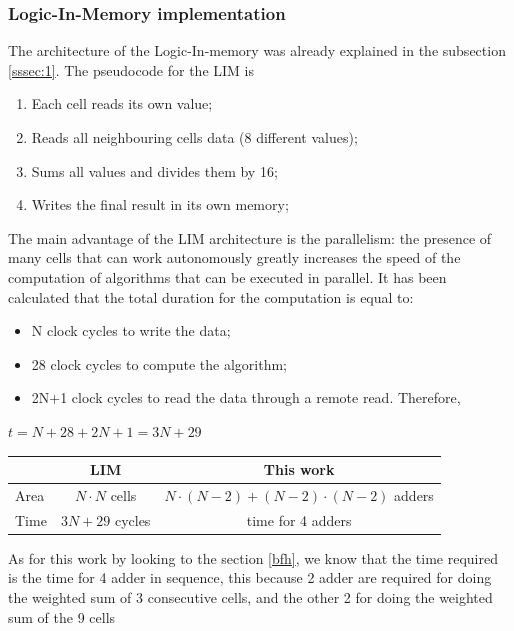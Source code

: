 	  \subsubsection{Logic-In-Memory implementation}
	  The architecture of the Logic-In-memory was already explained in the subsection \ref{sssec:1}.
	  The pseudocode for the LIM is
	  \begin{enumerate}
	  	\item Each cell reads its own value;
	  	\item Reads all neighbouring cells data (8 different values); 
	  	\item Sums all values and divides them by 16;
	  	\item Writes the final result in its own memory;
	  \end{enumerate}
	 The main advantage of the LIM architecture is the parallelism: the presence of many cells that can work autonomously greatly increases the speed of the computation of algorithms that can be executed in parallel.
	 It has been calculated that the total duration for the computation is equal to: 
	 \begin{itemize}
	 	\item N clock cycles to write the data;
	 	\item 28 clock cycles to compute the algorithm;
	 	\item 2N+1 clock cycles to read the data through a remote read. Therefore,
	 \end{itemize}   \begin{center}
	 	 $ t = N + 28 + 2N +1=3N + 29 $
	\end{center}
	
	 \begin{center}
	 	\begin{tabular}{ | p{1.7cm} | c | c |}
	 		
	 		\hline
	 		\label{table:bf_tab} & LIM & This work \\
	 		\hline
	 		Area & $ N\cdotp N $ cells  &  $ N\cdotp (N-2)+(N-2)\cdotp (N-2)$ adders \\
	 		\hline
	 		Time & $ 3N + 29 $ cycles
	 		&
	 		 time for 4 adders   \\
	 		\hline
	 		
	 	\end{tabular}
	 \end{center}
	As for this work by looking to the section \ref{bfh}, we know that the time required is the time for 4 adder in sequence, this because 2 adder are required for doing the weighted sum of 3 consecutive cells, and the other 2 for doing the weighted sum of the 9 cells

